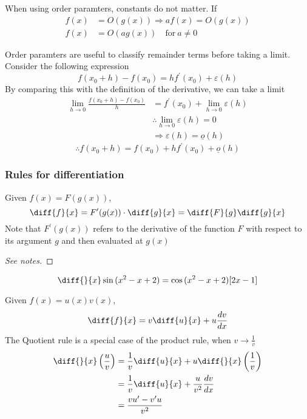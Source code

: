 \documentclass{article}
\begin{document}
\begin{remark}
    When using order paramters, constants do not matter. If 
    \begin{align*}
        f(x) &= O(g(x)) \Rightarrow af(x) = O(g(x)) \\
        f(x) &= O(ag(x)) \quad \text{for} \ a \neq 0
    \end{align*}
\end{remark}

Order paramters are useful to classify remainder terms before taking a limit. Consider the following expression
\[
    f(x_0 + h) - f(x_0) = h f^{\prime}(x_0) + \varepsilon(h) 
\]
By comparing this with the definition of the derivative, we can take a limit
\begin{align*}
    \lim_{h \rightarrow 0}{\frac{f(x_0 + h) - f(x_0)}{h}} &= f^{\prime}(x_0) + \lim_{h \rightarrow 0}{\varepsilon(h)} \\
    &\therefore  \lim_{h \rightarrow 0}{\varepsilon(h)} = 0 \\
    &\Rightarrow \varepsilon(h) = \underline{o}(h)
\end{align*}
\[
    \therefore f(x_0 + h) = f(x_0) + h f^{\prime}(x_0) + \underline{o}(h)
\]


\subsubsection{Rules for differentiation}
\begin{thm}
    Given $f(x) = F(g(x))$,
    \[
        \diff{f}{x} = F^{\prime}(g(x)) \cdot \diff{g}{x}   = \diff{F}{g}\diff{g}{x}
    \]
    Note that $F^{\prime}(g(x))$ refers to the derivative of the function $F$ with respect to its argument $g$ and then evaluated at $g(x)$
\end{thm}

\begin{proof}[See notes]
    
\end{proof}

\begin{eg}
    \[
        \diff{}{x} \sin{(x^2 -x +2)} = \cos{(x^2 -x +2)}[2x - 1]
    \]
\end{eg}

\begin{thm}
    Given $f(x) = u(x)v(x)$,
    \[
        \diff{f}{x} = v \diff{u}{x} + u \frac{dv}{dx}
    \]
    The Quotient rule is a special case of the product rule, when $v \rightarrow \frac{1}{v}$
    \begin{align*}
        \diff{}{x}\left(\frac{u}{v}\right) &= \frac{1}{v}\diff{u}{x} + u \diff{}{x}\left(\frac{1}{v}\right) \\
        &= \frac{1}{v}\diff{u}{x} + \frac{u}{v^2} \frac{dv}{dx} \\
        &= \frac{vu^{\prime} - v^{\prime}u}{v^2}
    \end{align*}
\end{thm}
\end{document}
